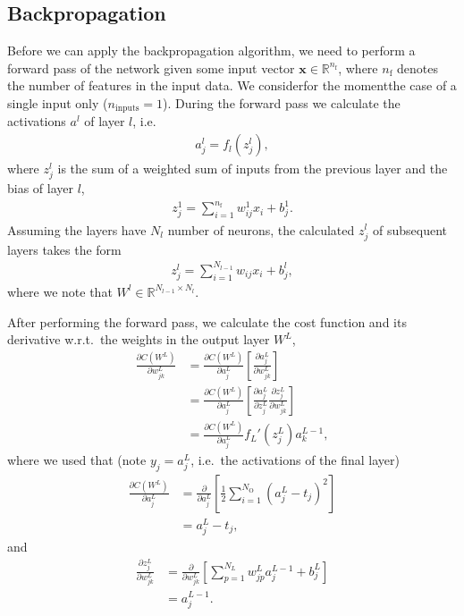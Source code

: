 \documentclass[a4paper, twocolumn]{article}
\begin{document}
\subsection{Backpropagation \label{sect:backprop}}
Before we can apply the backpropagation algorithm, we need to perform a forward pass of the network given some input vector $\mathbf{x}\in\mathds{R}^{n_\text{f}}$, where $n_\text{f}$ denotes the number of features in the input data. We consider\textemdash for the moment\textemdash the case of a single input only ($n_\text{inputs}=1$). During the forward pass we calculate the activations $a^l$ of layer $l$, i.e.\ 
\begin{align}
a^l_j = f_l(z_j^l), 
\end{align}
where $z_j^l$ is the sum of a weighted sum of inputs from the previous layer and the bias of layer $l$, 
\begin{align}
z_j^1 = \sum_{i=1}^{n_\text{f}}w_{ij}^1x_i+b_j^1.
\end{align}
Assuming the layers have $N_l$ number of neurons, the calculated $z_j^l$ of subsequent layers takes the form
\begin{align}
z_j^l = \sum_{i=1}^{N_{l-1}}w_{ij}x_i+b_j^l,
\end{align}
where we note that $W^l\in\mathds{R}^{N_{l-1}\times N_l}$.

After performing the forward pass, we calculate the cost function and its derivative w.r.t.\ the weights in the output layer $W^L$,
\begin{align}
\frac{\partial C(W^L)}{\partial w_{jk}^L} &= \frac{\partial C(W^L)}{\partial a_j^L}\left[\frac{\partial a_j^L}{\partial w_{jk}^L}\right] \nonumber\\
%
&= \frac{\partial C(W^L)}{\partial a_j^L} \left[ \frac{\partial a_j^L}{\partial z_j^L}\frac{\partial z_j^L}{\partial w_{jk}^L} \right] \nonumber \\
%
&= \frac{\partial C(W^L)}{\partial a_j^L} f_L'(z_j^L)  a_k^{L-1}, \label{eq:deltaL}
\end{align}
where we used that (note $y_j=a_j^L$, i.e.\ the activations of the final layer)
\begin{align}
\frac{\partial C(W^L)}{\partial a_j^L} &= \frac{\partial }{\partial a_j^L} \left[\frac{1}{2}\sum_{i=1}^{N_\text{O}} (a_j^L-t_j)^2\right] \nonumber \\
&= a_j^L-t_j,
\end{align}
and 
\begin{align}
\frac{\partial z_j^L}{\partial w_{jk}^L} &= \frac{\partial}{\partial w_{jk}^L} \left[\sum_{p=1}^{N_L} w_{jp}^La_j^{L-1}+b_j^L\right] \nonumber \\
&= a_j^{L-1}. 
\end{align}
\end{document}
